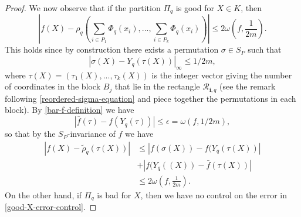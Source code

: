 \documentclass[twoside,11pt]{article}
\begin{document}
\begin{proof}
        We now observe that if the partition $\Pi_q$ is good for $X\in K$, then
        \begin{equation}\label{good-X-error-control}
            \left|f(X) - \rho_q\left(\sum_{i\in P_1} \Phi_{q}(x_i),...,\sum_{i\in P_k} \Phi_{q}(x_i)\right)\right| \leq 2\omega\left(f,\frac{1}{2m}\right).
        \end{equation}
        This holds since by construction there exists a permutation $\sigma\in S_P$ such that
        \begin{equation}
        |\sigma(X) - Y_q(\tau(X))|_\infty \leq 1/2m,
        \end{equation}
        where $\tau(X) = (\tau_1(X),...,\tau_k(X))$ is the integer vector giving the number of coordinates in the block $B_j$ that lie in the rectangle $\mathcal{R}_{\textbf{i},q}$  
        (see the remark following \eqref{reordered-sigma-equation} and piece together the permutations in each block). By \eqref{bar-f-definition} we have
        \begin{equation}
            |\bar{f}(\tau) - f(Y_q(\tau))| \leq \epsilon = \omega(f,1/2m),
        \end{equation} 
        so that by the $S_P$-invariance of $f$ we have
        \begin{equation}\label{key-inequality}
        \begin{split}
            \left|f(X) - \tilde{\rho}_q\left(\tau(X)\right)\right| &\leq |f(\sigma(X)) - f(Y_q(\tau(X))|\\
            &+ |f(Y_q((X)) - \bar{f}(\tau(X))|\\
            &\leq 2\omega\left(f,\frac{1}{2m}\right).
        \end{split}
        \end{equation}
        On the other hand, if $\Pi_q$ is bad for $X$, then we have no control on the error in \eqref{good-X-error-control}.


\end{proof}
\end{document}
